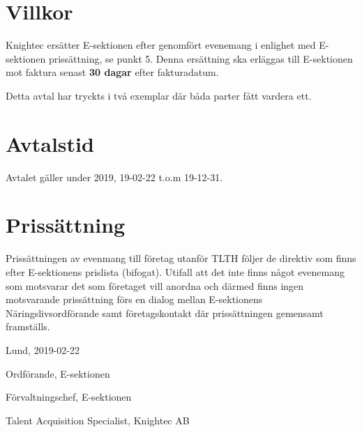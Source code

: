 \documentclass[10pt]{article}
\def\date{2019-02-22} %
\begin{document}
        \section{Villkor}
        Knightec ersätter E-sektionen efter genomfört evenemang i enlighet med E-sektionen prissättning, se punkt 5. Denna ersättning ska erläggas till E-sektionen mot faktura senast \textbf{30 dagar} efter fakturadatum.
        \newline

        Detta avtal har tryckts i två exemplar där båda parter fått vardera ett.
        
        \section{Avtalstid}
        Avtalet gäller under 2019, 19-02-22 t.o.m 19-12-31.

	 \section{Prissättning}
	 Prissättningen av evenmang till företag utanför TLTH följer de direktiv som finns efter E-sektionens prislista (bifogat). Utifall att det inte finns något evenemang som motsvarar det som företaget vill anordna och därmed finns ingen motsvarande prissättning förs en dialog mellan E-sektionens Näringslivsordförande samt företagskontakt där prissättningen gemensamt framställs.


		
        \begin{signatures}{3}
            Lund, \date
            \signature{Edvard Carlsson}{Ordförande, E-sektionen}
            \signature{Henrik Ramström}{Förvaltningschef, E-sektionen}
            \signature{Rebecca Dovega}{Talent Acquisition Specialist, Knightec AB
}
        \end{signatures}
    
\end{document}
